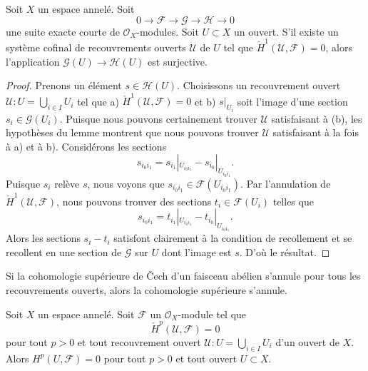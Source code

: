\begin{lemma}

\label{lemma-ses-cech-h1}
Soit $X$ un espace annelé. Soit $$
0 \to \mathcal{F} \to \mathcal{G} \to \mathcal{H} \to 0
$$ une suite exacte courte de $\mathcal{O}_X$-modules. Soit $U \subset X$ un ouvert. S'il existe un système cofinal de recouvrements ouverts $\mathcal{U}$ de $U$ tel que $\check{H}^1(\mathcal{U}, \mathcal{F}) = 0$, alors l'application $\mathcal{G}(U) \to \mathcal{H}(U)$ est surjective.
\end{lemma}

\begin{proof}

Prenons un élément $s \in \mathcal{H}(U)$. Choisissons un recouvrement ouvert
$\mathcal{U} : U = \bigcup_{i \in I} U_i$ tel que a) $\check{H}^1(\mathcal{U}, \mathcal{F}) = 0$ et b)
$s|_{U_i}$ soit l'image d'une section $s_i \in \mathcal{G}(U_i)$. Puisque nous pouvons certainement trouver $\mathcal{U}$ satisfaisant à (b), les hypothèses du lemme montrent que nous pouvons trouver
$\mathcal{U}$ satisfaisant à la fois à a) et à b). Considérons les sections
$$
s_{i_0i_1} = s_{i_1}|_{U_{i_0i_1}} - s_{i_0}|_{U_{i_0i_1}}.
$$
Puisque $s_i$ relève $s$, nous voyons que $s_{i_0i_1} \in \mathcal{F}(U_{i_0i_1})$. Par l'annulation de $\check{H}^1(\mathcal{U}, \mathcal{F})$, nous pouvons trouver des sections $t_i \in \mathcal{F}(U_i)$ telles que
$$
s_{i_0i_1} = t_{i_1}|_{U_{i_0i_1}} - t_{i_0}|_{U_{i_0i_1}}.
$$
Alors les sections $s_i - t_i$ satisfont clairement à la condition de recollement et se recollent en une section de $\mathcal{G}$ sur $U$ dont l'image est $s$. D'où le résultat.

\end{proof}

\begin{lemma}

\label{lemma-cech-vanish}

\begin{slogan}
Si la cohomologie supérieure de {\v C}ech d'un faisceau abélien s'annule pour tous les recouvrements ouverts, alors la cohomologie supérieure s'annule.
\end{slogan}
Soit $X$ un espace annelé. Soit $\mathcal{F}$ un $\mathcal{O}_X$-module tel que $$
\check{H}^p(\mathcal{U}, \mathcal{F}) = 0
$$ pour tout $p > 0$ et tout recouvrement ouvert $\mathcal{U} : U = \bigcup_{i \in I} U_i$ d'un ouvert de $X$. Alors $H^p(U, \mathcal{F}) = 0$ pour tout $p > 0$ et tout ouvert $U \subset X$.
\end{lemma}


